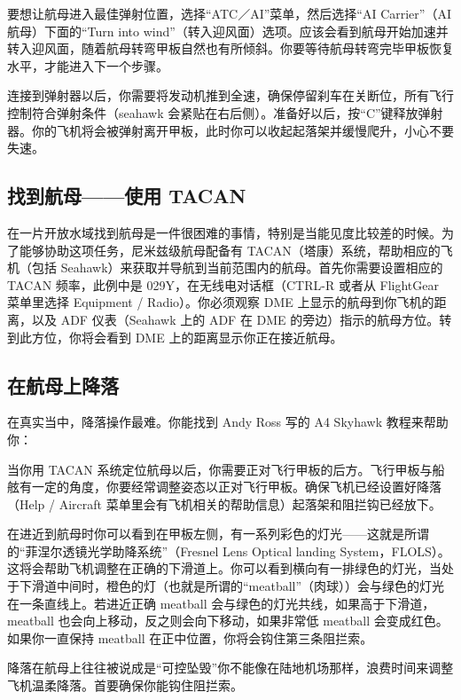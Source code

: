 要想让航母进入最佳弹射位置，选择“ATC／AI”菜单，然后选择“AI Carrier”（AI 航母）下面的“Turn into wind”（转入迎风面）选项。应该会看到航母开始加速并转入迎风面，随着航母转弯甲板自然也有所倾斜。你要等待航母转弯完毕甲板恢复水平，才能进入下一个步骤。

连接到弹射器以后，你需要将发动机推到全速，确保停留刹车在关断位，所有飞行控制符合弹射条件（seahawk 会紧贴在右后侧）。准备好以后，按“C”键释放弹射器。你的飞机将会被弹射离开甲板，此时你可以收起起落架并缓慢爬升，小心不要失速。

\subsection{找到航母——使用 TACAN}

在一片开放水域找到航母是一件很困难的事情，特别是当能见度比较差的时候。为了能够协助这项任务，尼米兹级航母配备有 TACAN（塔康）系统，帮助相应的飞机（包括 Seahawk）来获取并导航到当前范围内的航母。首先你需要设置相应的 TACAN 频率，此例中是 029Y，在无线电对话框（CTRL-R 或者从 FlightGear 菜单里选择 Equipment / Radio）。你必须观察 DME 上显示的航母到你飞机的距离，以及 ADF 仪表（Seahawk 上的 ADF 在 DME 的旁边）指示的航母方位。转到此方位，你将会看到 DME 上的距离显示你正在接近航母。

\subsection{在航母上降落}

在真实当中，降落操作最难。你能找到 Andy Ross 写的 A4 Skyhawk 教程来帮助你：

\noindent
{}

当你用 TACAN 系统定位航母以后，你需要正对飞行甲板的后方。飞行甲板与船舷有一定的角度，你要经常调整姿态以正对飞行甲板。确保飞机已经设置好降落（Help / Aircraft 菜单里会有飞机相关的帮助信息）起落架和阻拦钩已经放下。

在进近到航母时你可以看到在甲板左侧，有一系列彩色的灯光——这就是所谓的“菲涅尔透镜光学助降系统”（Fresnel Lens Optical landing System，FLOLS）。这将会帮助飞机调整在正确的下滑道上。你可以看到横向有一排绿色的灯光，当处于下滑道中间时，橙色的灯（也就是所谓的“meatball”（肉球））会与绿色的灯光在一条直线上。若进近正确 meatball 会与绿色的灯光共线，如果高于下滑道，meatball 也会向上移动，反之则会向下移动，如果非常低 meatball 会变成红色。如果你一直保持 meatball 在正中位置，你将会钩住第三条阻拦索。

降落在航母上往往被说成是“可控坠毁”你不能像在陆地机场那样，浪费时间来调整飞机温柔降落。首要确保你能钩住阻拦索。

